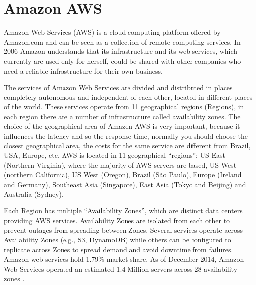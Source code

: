 \section{Amazon AWS}
\label{sec:Amazon AWS}

Amazon Web Services (AWS) is a cloud-computing platform offered by Amazon.com and can be seen as a collection of remote computing services.
In 2006 Amazon understands that its infrastructure and its web services, which currently are used only for herself, could be shared with other companies who need a reliable infrastructure for their own business.

The services of Amazon Web Services are divided and distributed in places completely autonomous and independent of each other, located in different places of the world. These services operate from 11 geographical regions (Regions), in each region there are a number of infrastructure called availability zones.
The choice of the geographical area of Amazon AWS is very important, because it influences the latency and so the response time, normally you should choose the closest geographical area, the costs for the same service are different from Brazil, USA, Europe, etc.
AWS is located in 11 geographical ``regions'': US East (Northern Virginia), where the majority of AWS servers are based,\cite{aws_stats1} US West (northern California), US West (Oregon), Brazil (São Paulo), Europe (Ireland and Germany), Southeast Asia (Singapore), East Asia (Tokyo and Beijing) and Australia (Sydney).

Each Region has multiple ``Availability Zones'', which are distinct data centers providing AWS services. Availability Zones are isolated from each other to prevent outages from spreading between Zones. Several services operate across Availability Zones (e.g., S3, DynamoDB) while others can be configured to replicate across Zones to spread demand and avoid downtime from failures. Amazon web services hold 1.79\% market share. As of December 2014, Amazon Web Services operated an estimated 1.4 Million servers across 28 availability zones \cite{aws_stats2}.
